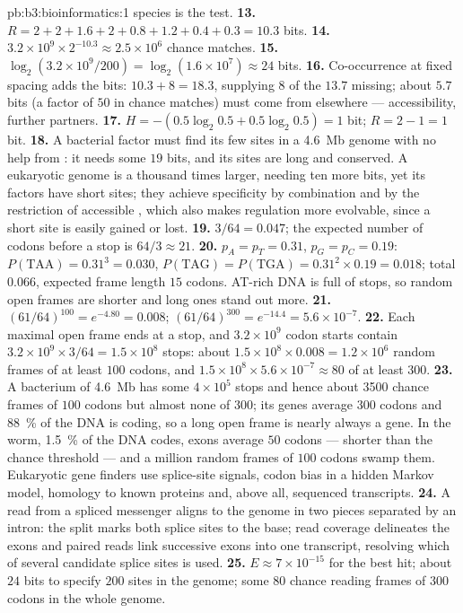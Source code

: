 \begin{solution}{pb:b3:bioinformatics:1}
species is the test.
\textbf{13.} $R = 2 + 2 + 1.6 + 2 + 0.8 + 1.2 + 0.4 + 0.3 = 10.3$ bits.
\textbf{14.} $3.2\times 10^{9}\times 2^{-10.3} \approx 2.5\times 10^{6}$
chance matches.
\textbf{15.} $\log_{2}(3.2\times 10^{9}/200) = \log_{2}(1.6\times 10^{7})
\approx 24$ bits.
\textbf{16.} Co-occurrence at fixed spacing adds the bits: $10.3 + 8 =
18.3$, supplying $8$ of the $13.7$ missing; about $5.7$ bits (a factor
of $50$ in chance matches) must come from elsewhere --- 
accessibility, further partners.
\textbf{17.} $H = -(0.5\log_{2}0.5 + 0.5\log_{2}0.5) = 1$ bit; $R = 2 -
1 = 1$ bit.
\textbf{18.} A bacterial factor must find its few sites in a
\qty{4.6}{Mb} genome with no help from : it needs some $19$
bits, and its sites are long and conserved. A eukaryotic genome is a
thousand times larger, needing ten more bits, yet its factors have
short sites; they achieve specificity by combination and by the
restriction of accessible , which also makes regulation more
evolvable, since a short site is easily gained or lost.
\textbf{19.} $3/64 = 0.047$; the expected number of codons before a
stop is $64/3 \approx 21$.
\textbf{20.} $p_{A} = p_{T} = 0.31$, $p_{G} = p_{C} = 0.19$: $P(\text{TAA})
= 0.31^{3} = 0.030$, $P(\text{TAG}) = P(\text{TGA}) = 0.31^{2}\times 0.19
= 0.018$; total $0.066$, expected frame length $15$ codons. AT-rich
DNA is full of stops, so random open frames are shorter and long ones
stand out more.
\textbf{21.} $(61/64)^{100} = e^{-4.80} = 0.008$; $(61/64)^{300} =
e^{-14.4} = 5.6\times 10^{-7}$.
\textbf{22.} Each maximal open frame ends at a stop, and $3.2\times
10^{9}$ codon starts contain $3.2\times 10^{9}\times 3/64 = 1.5\times
10^{8}$ stops: about $1.5\times 10^{8}\times 0.008 = 1.2\times 10^{6}$
random frames of at least $100$ codons, and $1.5\times 10^{8}\times
5.6\times 10^{-7} \approx 80$ of at least $300$.
\textbf{23.} A bacterium of \qty{4.6}{Mb} has some $4\times 10^{5}$ stops
and hence about \num{3500} chance frames of $100$ codons but almost none
of $300$; its genes average $300$ codons and \qty{88}{\%} of the DNA is
coding, so a long open frame is nearly always a gene. In the worm,
\qty{1.5}{\%} of the DNA codes, exons average $50$ codons --- shorter
than the chance threshold --- and a million random frames of $100$
codons swamp them. Eukaryotic gene finders use splice-site signals,
codon bias in a hidden Markov model, homology to known proteins and,
above all, sequenced transcripts.
\textbf{24.} A read from a spliced messenger aligns to the genome in
two pieces separated by an intron: the split marks both splice sites
to the base; read coverage delineates the exons and paired reads link
successive exons into one transcript, resolving which of several
candidate splice sites is used.
\textbf{25.} $E \approx 7\times 10^{-15}$ for the best hit; about $24$
bits to specify $200$ sites in the genome; some $80$ chance reading
frames of $300$ codons in the whole genome.
\end{solution}
